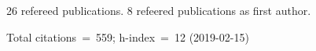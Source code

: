 26 refereed publications. 8 refeered publications as first author.

Total citations~=~559; h-index~=~12 (2019-02-15)